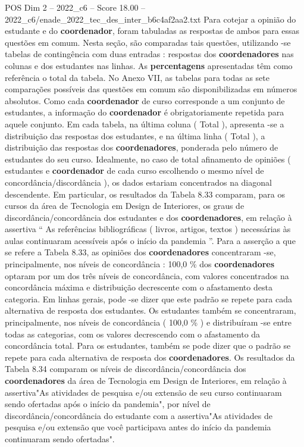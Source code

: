 \begin{textsample}{POS Dim 2 – 2022\_c6 – Score 18.00 – 2022\_c6/enade\_2022\_tec\_des\_inter\_b6c4af2aa2.txt}
Para cotejar a opinião do estudante e do \textbf{coordenador}, foram tabuladas as respostas de ambos para essas questões em comum.
Nesta seção, são comparadas tais questões, utilizando -se tabelas de contingência com duas entradas : respostas dos \textbf{coordenadores} nas colunas e dos estudantes nas linhas.
As \textbf{percentagens} apresentadas têm como referência o total da tabela.
No Anexo VII, as tabelas para todas as sete comparações possíveis das questões em comum são disponibilizadas em números absolutos.
Como cada \textbf{coordenador} de curso corresponde a um conjunto de estudantes, a informação do \textbf{coordenador} é obrigatoriamente repetida para aquele conjunto.
Em cada tabela, na última coluna ( Total ), apresenta -se a distribuição das respostas dos estudantes, e na última linha ( Total ), a distribuição das respostas dos \textbf{coordenadores}, ponderada pelo número de estudantes do seu curso.
Idealmente, no caso de total afinamento de opiniões ( estudantes e \textbf{coordenador} de cada curso escolhendo o mesmo nível de concordância/discordância ), os dados estariam concentrados na diagonal descendente.
Em particular, os resultados da Tabela 8.33 comparam, para os cursos da área de Tecnologia em Design de Interiores, os graus de discordância/concordância dos estudantes e dos \textbf{coordenadores}, em relação à assertiva “ As referências bibliográficas ( livros, artigos, textos ) necessárias às aulas continuaram acessíveis após o início da pandemia ”.
Para a asserção a que se refere a Tabela 8.33, as opiniões dos \textbf{coordenadores} concentraram -se, principalmente, nos níveis de concordância : 100,0 \% dos \textbf{coordenadores} optaram por um dos três níveis de concordância, com valores concentrados na concordância máxima e distribuição decrescente com o afastamento desta categoria.
Em linhas gerais, pode -se dizer que este padrão se repete para cada alternativa de resposta dos estudantes.
Os estudantes também se concentraram, principalmente, nos níveis de concordância ( 100,0 \% ) e distribuíram -se entre todas as categorias, com os valores decrescendo com o afastamento da concordância total.
Para os estudantes, também se pode dizer que o padrão se repete para cada alternativa de resposta dos \textbf{coordenadores}.
Os resultados da Tabela 8.34 comparam os níveis de discordância/concordância dos \textbf{coordenadores} da área de Tecnologia em Design de Interiores, em relação à assertiva"As atividades de pesquisa e/ou extensão de seu curso continuaram sendo ofertadas após o início da pandemia", por nível de discordância/concordância do estudante com a assertiva"As atividades de pesquisa e/ou extensão que você participava antes do início da pandemia continuaram sendo ofertadas".

\end{textsample}
